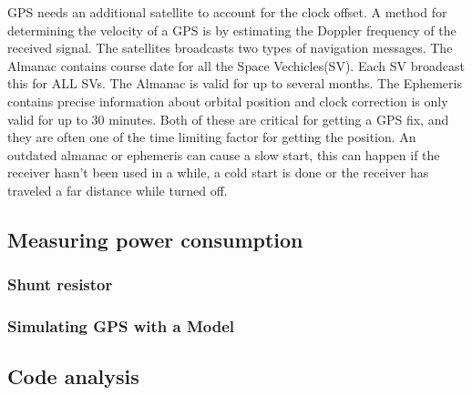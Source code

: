   GPS needs an additional satellite to account for the clock offset. A method for determining the velocity of a GPS is by estimating the Doppler frequency of the received signal. The satellites broadcasts two types of navigation messages. The Almanac contains course date for all the Space Vechicles(SV). Each SV broadcast this for ALL SVs. The Almanac is valid for up to several months. The Ephemeris contains precise information about orbital position and clock correction is only valid for up to 30 minutes. Both of these are critical for getting a GPS fix, and they are often one of the time limiting factor for getting the position. 
  An outdated almanac or ephemeris can cause a slow start, this can happen if the receiver hasn't been used in a while, a cold start is done or the receiver has traveled a far distance while turned off.

\subsection{Measuring power consumption}

\subsubsection{Shunt resistor}
\subsubsection{Simulating GPS with a Model}
\subsection{Code analysis}

